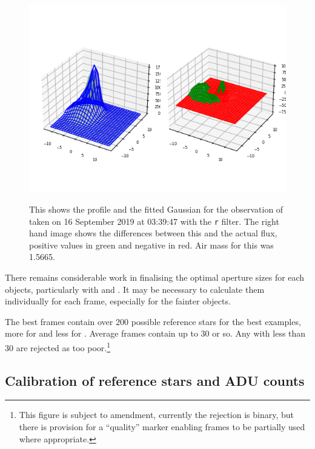 \begin{figure}[!htbp]
\begin{center}
\includegraphics[scale=0.90]{images/badfit.png} \\
\vspace{-.5cm}
\end{center}
\caption{This shows the profile and the fitted
Gaussian for the observation of {\ross} taken on 16
September 2019 at 03:39:47 with the \texttt{r} filter. The right
hand image shows the differences between this and
the actual flux, positive values in green and
negative in red. Air mass for this was 1.5665.}
\protect\label{fig:badfit}
\end{figure}

There remains considerable work in finalising the optimal aperture sizes for
each objects, particularly with {\prox} and {\bstar}. It may be necessary to
calculate them individually for each frame, especially for the fainter objects.

The best frames contain over 200 possible reference stars for the best
examples, more for {\prox} and less for {\bstar}. Average frames contain up to
30 or so. Any with less than 30 are rejected as too poor.\footnote{This figure
is subject to amendment, currently the rejection is binary, but there is
provision for a ``quality'' marker enabling frames to be partially used where appropriate.}

\subsection{Calibration of reference stars and ADU counts}
\protect\label{section:calibrationrefstars}

